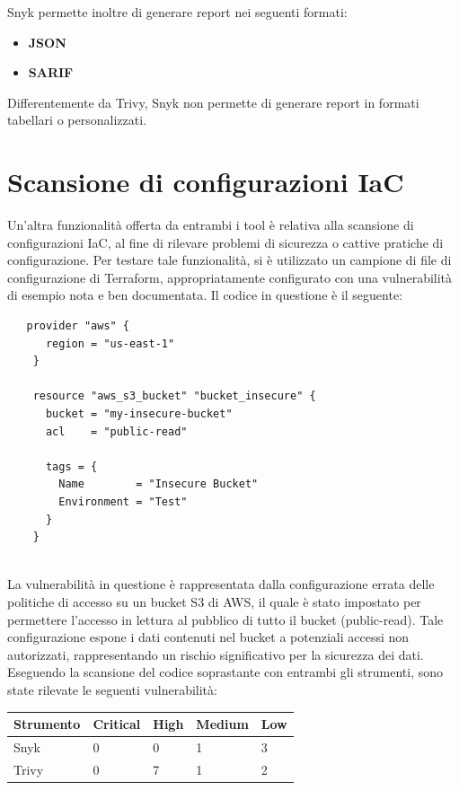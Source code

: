 Snyk permette inoltre di generare report nei seguenti formati:
\begin{itemize}
   \item\textbf{JSON}
   \item\textbf{SARIF}
\end{itemize}

Differentemente da Trivy, Snyk non permette di generare report in formati tabellari o personalizzati.

\section{Scansione di configurazioni IaC}
Un'altra funzionalità offerta da entrambi i tool è relativa alla scansione di configurazioni IaC, al fine di rilevare problemi di sicurezza o cattive pratiche di configurazione. Per testare tale funzionalità, si è utilizzato un campione di file di configurazione di Terraform, appropriatamente configurato con una vulnerabilità di esempio nota e ben documentata. Il codice in questione è il seguente:
\begin{lstlisting}
   provider "aws" {
      region = "us-east-1"
    }
    
    resource "aws_s3_bucket" "bucket_insecure" {
      bucket = "my-insecure-bucket"
      acl    = "public-read"
    
      tags = {
        Name        = "Insecure Bucket"
        Environment = "Test"
      }
    }
    
\end{lstlisting}


La vulnerabilità in questione è rappresentata dalla configurazione errata delle politiche di accesso su un bucket S3 di AWS, il quale è stato impostato per permettere l'accesso in lettura al pubblico di tutto il bucket (public-read). Tale configurazione espone i dati contenuti nel bucket a potenziali accessi non autorizzati, rappresentando un rischio significativo per la sicurezza dei dati.
Eseguendo la scansione del codice soprastante con entrambi gli strumenti, sono state rilevate le seguenti vulnerabilità:

\begin{center}
   \begin{tabularx}{0.8\textwidth}{|X|X|X|X|X|}
      \hline
      \textbf{Strumento} & \textbf{Critical} & \textbf{High} & \textbf{Medium} & \textbf{Low} \\
      \hline
      Snyk               & 0                 & 0             & 1               & 3            \\
      \hline
      Trivy              & 0                 & 7             & 1               & 2            \\
      \hline
   \end{tabularx}
\end{center}

